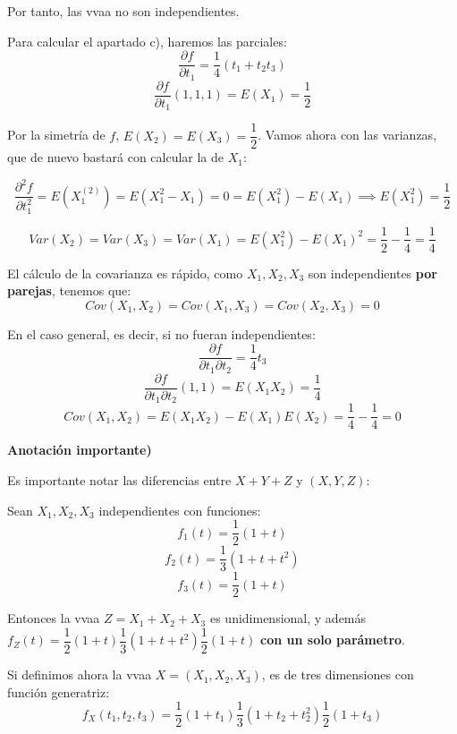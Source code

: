 \documentclass[openany]{book}
\begin{document}
\begin{exercise}
    Por tanto, las vvaa no son independientes.

    Para calcular el apartado c), haremos las parciales:
    $$ \dfrac{\partial f}{\partial t_1} = \dfrac{1}{4}(t_1+t_2t_3) $$
    $$ \dfrac{\partial f}{\partial t_1}(1,1,1) = E(X_1) = \dfrac{1}{2} $$

    Por la simetría de $ f $, $ E(X_2) = E(X_3) = \dfrac{1}{2} $. Vamos ahora con las varianzas, que de nuevo bastará con calcular la de $ X_1 $:

    $$ \dfrac{\partial ^2 f}{\partial t_1^2} = E(X_1 ^{(2)}) = E(X_1^2-X_1) = 0 = E(X_1^2)-E(X_1 )\implies E(X_1^2) = \dfrac{1}{2} $$

    $$Var(X_{2}) =Var(X_3) = Var(X_1) = E(X_1^2)-E(X_1)^2 = \dfrac{1}{2}-\dfrac{1}{4}=\dfrac{1}{4} $$

    El cálculo de la covarianza es rápido, como $ X_1,X_2,X_3 $ son independientes \textbf{por parejas}, tenemos que:
    $$ Cov(X_1,X_2) = Cov(X_1,X_3) = Cov(X_2,X_3) = 0 $$

    En el caso general, es decir, si no fueran independientes:
    $$ \dfrac{\partial f}{\partial t_1 \partial t_2} = \dfrac{1}{4}t_3 $$
    $$ \dfrac{\partial f}{\partial t_1 \partial t_2}(1,1) = E(X_1X_2) = \dfrac{1}{4} $$
    $$ Cov(X_1,X_2) = E(X_1X_2)-E(X_1)E(X_2) = \dfrac{1}{4}-\dfrac{1}{4} = 0 $$

    \begin{flushright}
        \textbf{Anotación importante)}

    \end{flushright}

    Es importante notar las diferencias entre $ X+Y+Z $ y $ (X,Y,Z) $:

    Sean $ X_1,X_2,X_3 $ independientes con funciones:
    $$ f_{1}(t) = \dfrac{1}{2}(1+t) $$
    $$ f_{2}(t) = \dfrac{1}{3}(1+t+t^2) $$
    $$ f_{3}(t) = \dfrac{1}{2}(1+t) $$

    Entonces la vvaa $ Z = X_1+X_2+X_3 $ es unidimensional, y además $ f_{Z}(t) = \dfrac{1}{2}(1+t)\dfrac{1}{3}(1+t+t^2)\dfrac{1}{2}(1+t) $ \textbf{con un solo parámetro}.

    Si definimos ahora la vvaa $ X = (X_1,X_2,X_3) $, es de tres dimensiones con función generatriz:
    $$ f_{X}(t_1,t_2,t_3)= \dfrac{1}{2}(1+t_1)\dfrac{1}{3}(1+t_2+t_2^2)\dfrac{1}{2}(1+t_3)$$

\end{exercise}
\end{document}
